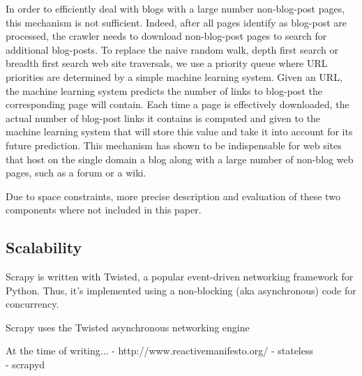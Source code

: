 In order to efficiently deal with blogs with a large number non-blog-post pages, this mechanism is not sufficient. Indeed, after all pages identify as blog-post are processed, the crawler needs to download non-blog-post pages to search for additional blog-posts. To replace the naive random walk, depth first search or breadth first search web site traversals, we use a priority queue where URL priorities are determined by a simple machine learning system. Given an URL, the machine learning system predicts the number of links to blog-post the corresponding page will contain. Each time a page is effectively downloaded, the actual number of blog-post links it contains is computed and given to the machine learning system that will store this value and take it into account for its future prediction. This mechanism has shown to be indispensable for web sites that host on the single domain a blog along with a large number of non-blog web pages, such as a forum or a wiki.

Due to space constraints, more precise description and evaluation of these two components where not included in this paper.


\subsection{Scalability}
Scrapy is written with Twisted, a popular event-driven networking framework for Python. Thus, it’s implemented using a non-blocking (aka asynchronous) code for concurrency.

Scrapy uses the Twisted\cite{twisted2013} asynchronous networking engine

At the time of writing...
- http://www.reactivemanifesto.org/
- stateless \\
- scrapyd \\
